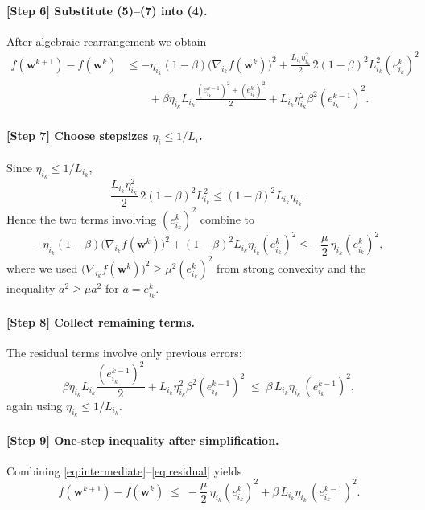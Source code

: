 \documentclass[11pt]{article}
\begin{document}
\paragraph{[Step 6] Substitute (5)–(7) into (4).}
After algebraic rearrangement we obtain
\[
\begin{aligned}
f(\mathbf w^{k+1})-f(\mathbf w^{k})
&\le
- \eta_{i_k}(1-\beta)\bigl(\nabla_{i_k} f(\mathbf w^{k})\bigr)^{2}
   + \frac{L_{i_k}\eta_{i_k}^{2}}{2}\,2(1-\beta)^{2}L_{i_k}^{2}(e^{k}_{i_k})^{2}\\
&\qquad
   +\beta\eta_{i_k} L_{i_k}\frac{(e^{k-1}_{i_k})^{2}+(e^{k}_{i_k})^{2}}{2}
   + L_{i_k}\eta_{i_k}^{2}\beta^{2}(e^{k-1}_{i_k})^{2}.
\end{aligned}
\tag{8}
\label{eq:intermediate}
\]

\paragraph{[Step 7] Choose stepsizes $\eta_i\le 1/L_i$.}
Since $\eta_{i_k}\le 1/L_{i_k}$,
\[
\frac{L_{i_k}\eta_{i_k}^{2}}{2}\,2(1-\beta)^{2}L_{i_k}^{2}
\le (1-\beta)^{2}L_{i_k}\eta_{i_k}\; .
\]
Hence the two terms involving $(e^{k}_{i_k})^{2}$ combine to
\[
- \eta_{i_k}(1-\beta)\bigl(\nabla_{i_k} f(\mathbf w^{k})\bigr)^{2}
+ (1-\beta)^{2}L_{i_k}\eta_{i_k}(e^{k}_{i_k})^{2}
\le -\frac{\mu}{2}\,\eta_{i_k} (e^{k}_{i_k})^{2},
\tag{9}
\label{eq:negterm}
\]
where we used $\bigl(\nabla_{i_k} f(\mathbf w^{k})\bigr)^{2}
\ge \mu^{2}(e^{k}_{i_k})^{2}$ from strong convexity
and the inequality $a^{2}\ge \mu a^{2}$ for $a=e^{k}_{i_k}$.

\paragraph{[Step 8] Collect remaining terms.}
The residual terms involve only previous errors:
\[
\beta\eta_{i_k} L_{i_k}\frac{(e^{k-1}_{i_k})^{2}}{2}
   + L_{i_k}\eta_{i_k}^{2}\beta^{2}(e^{k-1}_{i_k})^{2}
\;\le\;
\beta\,L_{i_k}\eta_{i_k}\,(e^{k-1}_{i_k})^{2},
\tag{10}
\label{eq:residual}
\]
again using $\eta_{i_k}\le 1/L_{i_k}$.

\paragraph{[Step 9] One‑step inequality after simplification.}
Combining \eqref{eq:intermediate}–\eqref{eq:residual} yields
\[
f(\mathbf w^{k+1})-f(\mathbf w^{k})
\;\le\;
-\frac{\mu}{2}\,\eta_{i_k}(e^{k}_{i_k})^{2}
   + \beta\,L_{i_k}\eta_{i_k}\,(e^{k-1}_{i_k})^{2}.
\tag{11}
\label{eq:one_step_final}
\]
\end{document}
